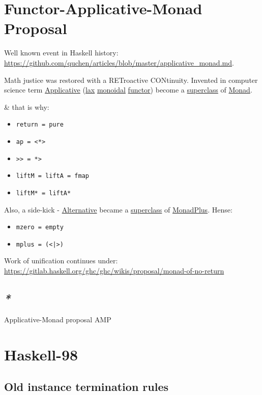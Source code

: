 \documentclass[a4paper,14pt,oneside]{book}
\begin{document}
\chapter{\label{orga475218}Functor-Applicative-Monad Proposal}
\label{sec:orgc11ae5b}
Well known event in Haskell history: \url{https://github.com/quchen/articles/blob/master/applicative\_monad.md}.

Math justice was restored with a RETroactive CONtinuity. Invented in computer science term \hyperref[orgc82dc9f]{Applicative} (\hyperref[org13628cd]{lax} \hyperref[org28da70f]{monoidal} \hyperref[org3453768]{functor}) become a \hyperref[orgb83c448]{superclass} of \hyperref[orge301261]{Monad}.

\& that is why:
\begin{itemize}
\item \texttt{return = pure}
\item \texttt{ap = <*>}
\item \texttt{>> = *>}
\item \texttt{liftM = liftA = fmap}
\item \texttt{liftM* = liftA*}
\end{itemize}

Also, a side-kick - \hyperref[org8f98483]{Alternative} became a \hyperref[orgb83c448]{superclass} of \hyperref[orga7b3d34]{MonadPlus}. Hense:
\begin{itemize}
\item \texttt{mzero = empty}
\item \texttt{mplus = (<|>)}
\end{itemize}

Work of unification continues under: \url{https://gitlab.haskell.org/ghc/ghc/wikis/proposal/monad-of-no-return}

\section{\emph{*}}
\label{sec:orgc3e08bf}

\label{org183223d}Applicative-Monad proposal
\label{org322a7a0}AMP

\chapter{Haskell-98}
\label{sec:orgf87a3bb}

\section{\label{org33d012f}Old instance termination rules}
\label{sec:org9d938b0}
\end{document}

